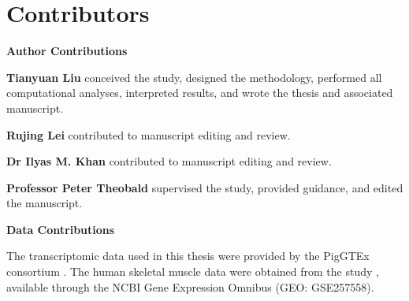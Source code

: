 \markboth{}{}
\chapter*{Contributors}
\label{chapter:Contributors}

\textbf{Author Contributions}

\textbf{Tianyuan Liu} conceived the study, designed the methodology, performed all computational analyses, interpreted results, and wrote the thesis and associated manuscript.

\textbf{Rujing Lei} contributed to manuscript editing and review.

\textbf{Dr Ilyas M. Khan} contributed to manuscript editing and review.

\textbf{Professor Peter Theobald} supervised the study, provided guidance, and edited the manuscript.

\vspace{1cm}

\textbf{Data Contributions}

The transcriptomic data used in this thesis were provided by the PigGTEx consortium \parencite{teng_compendium_2024, chen_construction_2025}. The human skeletal muscle data were obtained from the study \parencite{schaiter_molecular_2024}, available through the NCBI Gene Expression Omnibus (GEO: GSE257558).

